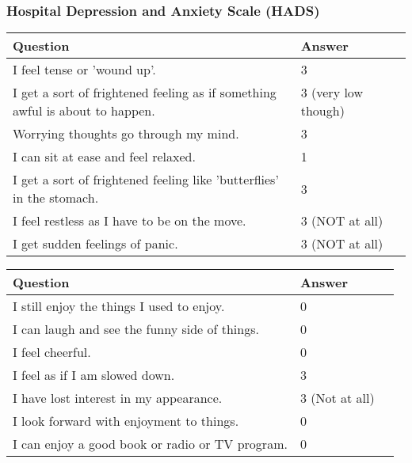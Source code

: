 \subsubsection{Hospital Depression and Anxiety Scale (HADS)}
\begin{table}[H]
    \centering
    \renewcommand{\arraystretch}{1.2}
    \begin{tabularx}{\textwidth}{|l|X|l|}
        \hline
        \textbf{Question} & \textbf{Answer} \\ \hline
        I feel tense or 'wound up'. &
        3
        \\ \hline
        I get a sort of frightened feeling as if something awful is about to happen. &
        3 (very low though)
        \\ \hline
        Worrying thoughts go through my mind. &
        3
        \\ \hline
        I can sit at ease and feel relaxed. &
        1
        \\ \hline
        I get a sort of frightened feeling like 'butterflies' in the stomach. &
        3
        \\ \hline
        I feel restless as I have to be on the move. &
        3 (NOT at all)
        \\ \hline
        I get sudden feelings of panic. &
        3 (NOT at all)
        \\ \hline
    \end{tabularx}
\end{table}
\begin{table}[H]
    \centering
    \renewcommand{\arraystretch}{1.2}
    \begin{tabularx}{\textwidth}{|l|X|l|}
        \hline
        \textbf{Question} & \textbf{Answer} \\ \hline
        I still enjoy the things I used to enjoy. &
        0
        \\ \hline
        I can laugh and see the funny side of things. &
        0
        \\ \hline
        I feel cheerful. &
        0
        \\ \hline
        I feel as if I am slowed down. &
        3
        \\ \hline
        I have lost interest in my appearance. &
        3 (Not at all)
        \\ \hline
        I look forward with enjoyment to things. &
        0
        \\ \hline
        I can enjoy a good book or radio or TV program. &
        0
        \\ \hline
    \end{tabularx}
\end{table}

